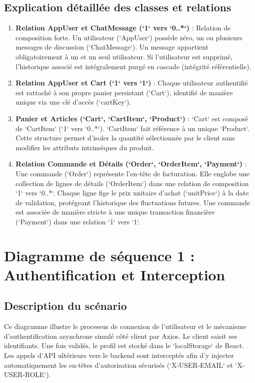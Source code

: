 \documentclass[12pt,a4paper,oneside]{report}
\begin{document}
\subsection{Explication détaillée des classes et relations}
\begin{enumerate}
    \item \textbf{Relation AppUser et ChatMessage (`1` vers `0..*`)} : Relation de composition forte. Un utilisateur (`AppUser`) possède zéro, un ou plusieurs messages de discussion (`ChatMessage`). Un message appartient obligatoirement à un et un seul utilisateur. Si l'utilisateur est supprimé, l'historique associé est intégralement purgé en cascade (intégrité référentielle).
    \item \textbf{Relation AppUser et Cart (`1` vers `1`)} : Chaque utilisateur authentifié est rattaché à son propre panier persistant (`Cart`), identifié de manière unique via une clé d'accès (`cartKey`).
    \item \textbf{Panier et Articles (`Cart`, `CartItem`, `Product`)} : `Cart` est composé de `CartItem` (`1` vers `0..*`). `CartItem` fait référence à un unique `Product`. Cette structure permet d'isoler la quantité sélectionnée par le client sans modifier les attributs intrinsèques du produit.
    \item \textbf{Relation Commande et Détails (`Order`, `OrderItem`, `Payment`)} : Une commande (`Order`) représente l'en-tête de facturation. Elle englobe une collection de lignes de détails (`OrderItem`) dans une relation de composition `1` vers `0..*`. Chaque ligne fige le prix unitaire d'achat (`unitPrice`) à la date de validation, protégeant l'historique des fluctuations futures. Une commande est associée de manière stricte à une unique transaction financière (`Payment`) dans une relation `1` vers `1`.
\end{enumerate}

\section{Diagramme de séquence 1 : Authentification et Interception}

\subsection{Description du scénario}
Ce diagramme illustre le processus de connexion de l'utilisateur et le mécanisme d'authentification asynchrone simulé côté client par Axios. Le client saisit ses identifiants. Une fois validés, le profil est stocké dans le `localStorage` de React. Les appels d'API ultérieurs vers le backend sont interceptés afin d'y injecter automatiquement les en-têtes d'autorisation sécurisés (`X-USER-EMAIL` et `X-USER-ROLE`).
\end{document}
